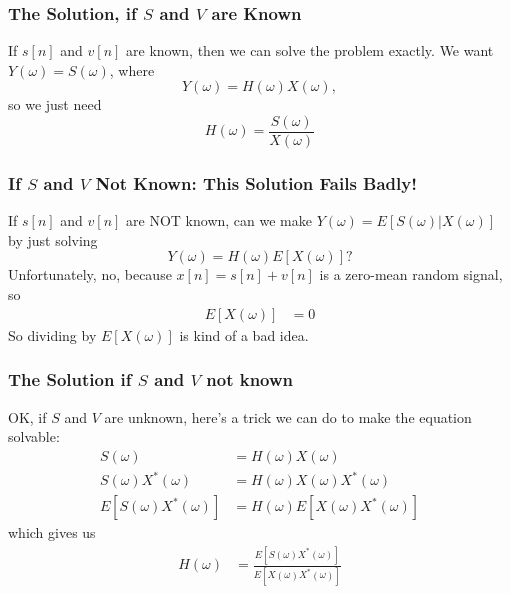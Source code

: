 \documentclass{beamer}
\begin{document}
\begin{frame}
  \frametitle{The Solution, if $S$ and $V$ are Known}

  If $s[n]$ and $v[n]$ are known, then we can solve the problem
  exactly.  We want $Y(\omega)=S(\omega)$, where 
  \begin{displaymath}
    Y(\omega) = H(\omega)X(\omega),
  \end{displaymath}
  so we just need
  \begin{displaymath}
    H(\omega) = \frac{S(\omega)}{X(\omega)}
  \end{displaymath}
\end{frame}

\begin{frame}
  \frametitle{If $S$ and $V$ Not Known: This Solution Fails Badly!}

  If $s[n]$ and $v[n]$ are NOT known, can we make 
  $Y(\omega)=E\left[S(\omega)|X(\omega)\right]$ by just solving
  \begin{displaymath}
    Y(\omega) = H(\omega)E\left[X(\omega)\right]?
  \end{displaymath}
  Unfortunately, no, because  $x[n]=s[n]+v[n]$ is a zero-mean random signal, so
  \begin{align*}
    E\left[X(\omega)\right] &= 0
  \end{align*}
  So dividing by $E\left[X(\omega)\right]$ is kind  of a bad idea.
\end{frame}

\begin{frame}
  \frametitle{The Solution if $S$ and $V$ not known}

  OK, if $S$ and $V$ are unknown, here's a trick we can do to make the
  equation solvable:
  \begin{align*}
    S(\omega) &= H(\omega)X(\omega)\\
    S(\omega)X^*(\omega) &= H(\omega)X(\omega)X^*(\omega)\\
    E\left[S(\omega)X^*(\omega)\right] &= H(\omega)E\left[X(\omega)X^*(\omega)\right]
  \end{align*}
  which gives us
  \begin{align*}
    H(\omega) &= \frac{E\left[S(\omega)X^*(\omega)\right]}{E\left[X(\omega)X^*(\omega)\right]}
  \end{align*}
\end{frame}
  
\end{document}
